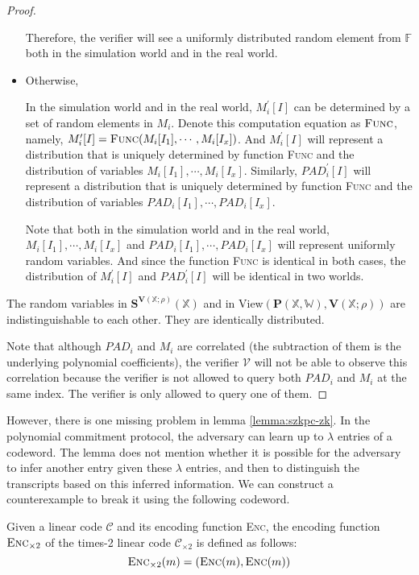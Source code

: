 \begin{proof}
\begin{itemize}
    Therefore, the verifier will see a uniformly distributed random element from $\mathbb{F}$ both in the simulation world and in the real world.
    
    \item Otherwise,
    
    In the simulation world and in the real world, $M_i^\prime[I]$ can be determined by a set of random elements in $M_i$. Denote this computation equation as $\textsc{Func}$, namely, $M_i^\prime[I] = \textsc{Func}(M_i[I_1], \cdots, M_i[I_x])$. And $M_i^\prime[I]$ will represent a distribution that is uniquely determined by function \textsc{Func} and the distribution of variables $M_i[I_1], \cdots, M_i[I_x]$. Similarly, $PAD_i^\prime[I]$ will represent a distribution that is uniquely determined by function \textsc{Func} and the distribution of variables $PAD_i[I_1], \cdots, PAD_i[I_x]$.
    
    Note that both in the simulation world and in the real world, $M_i[I_1], \cdots, M_i[I_x]$ and $PAD_i[I_1], \cdots, PAD_i[I_x]$ will represent uniformly random variables. And since the function \textsc{Func} is identical in both cases, the distribution of $M_i^\prime[I]$ and $PAD_i^\prime[I]$ will be identical in two worlds.
    
    
\end{itemize}

The random variables in $\textbf{S}^{\textbf{V}(\mathbb{X};\rho)}(\mathbb{X})$ and in $\text{View}(\textbf{P}(\mathbb{X}, \mathbb{W}), \textbf{V}(\mathbb{X};\rho))$ are indistinguishable to each other. They are identically distributed.

Note that although $PAD_i$ and $M_i$ are correlated (the subtraction of them is the underlying polynomial coefficients), the verifier $\mathcal{V}$ will not be able to observe this correlation because the verifier is not allowed to query both $PAD_i$ and $M_i$ at the same index. The verifier is only allowed to query one of them.

\end{proof}
However, there is one missing problem in lemma \ref{lemma:szkpc-zk}. In the polynomial commitment protocol, the adversary can learn up to $\lambda$ entries of a codeword.
The lemma does not mention whether it is possible for the adversary to infer another entry given these $\lambda$ entries, and then to distinguish the transcripts based on this inferred information. We can construct a counterexample to break it using the following codeword.

\begin{definition}
 Given a linear code $\mathcal{C}$ and its encoding function \textsc{Enc}, the encoding function $\textsc{Enc}_{\times 2}$ of the times-2 linear code $\mathcal{C}_{\times 2}$ is defined as follows:
 $$
    \textsc{Enc}_{\times 2} (m) = (\textsc{Enc}(m), \textsc{Enc}(m))
 $$
\end{definition}



